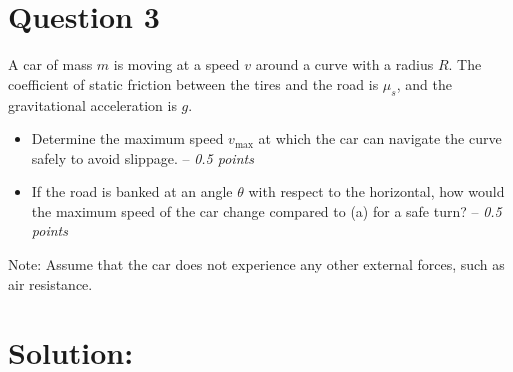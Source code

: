 \section*{Question 3}
A car of mass $m$ is moving at a speed $v$ around a curve with a radius $R$. The coefficient of static friction between the tires and the road is $\mu_s$, and the gravitational acceleration is $g$.

\begin{itemize}
    \item [\textbf{(a)}] Determine the maximum speed $v_{\text{max}}$ at which the car can navigate the curve safely to avoid slippage. -- \textit{0.5 points}
    
    \item [\textbf{(b)}] If the road is banked at an angle $\theta$ with respect to the horizontal, how would the maximum speed of the car change compared to (a) for a safe turn? -- \textit{0.5 points}
\end{itemize}

Note: Assume that the car does not experience any other external forces, such as air resistance.

\section*{Solution:}